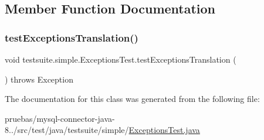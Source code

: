\subsection{Member Function Documentation}
\mbox{\label{classtestsuite_1_1simple_1_1_exceptions_test_a48e04060b958bc121cef6f69ae51f6a5}} 
\subsubsection{\texorpdfstring{test\+Exceptions\+Translation()}{testExceptionsTranslation()}}
{\footnotesize\ttfamily void testsuite.\+simple.\+Exceptions\+Test.\+test\+Exceptions\+Translation (\begin{DoxyParamCaption}{ }\end{DoxyParamCaption}) throws Exception}



The documentation for this class was generated from the following file\+:\begin{DoxyCompactItemize}
\item 
pruebas/mysql-\/connector-\/java-\/8../src/test/java/testsuite/simple/\mbox{\hyperlink{_exceptions_test_8java}{Exceptions\+Test.\+java}}\end{DoxyCompactItemize}

